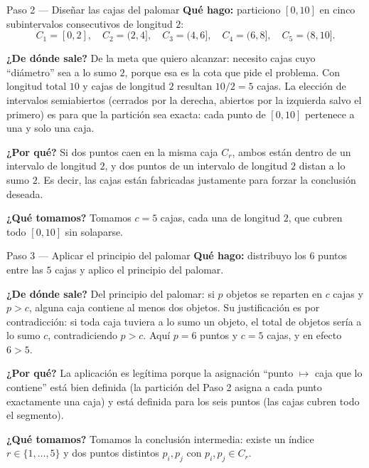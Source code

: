 \documentclass[11pt]{article}
\begin{document}
\begin{paso}{Paso 2 --- Diseñar las cajas del palomar}
\textbf{Qué hago:} particiono $[0,10]$ en cinco subintervalos consecutivos de longitud $2$:
\[
C_1=[0,2],\quad C_2=(2,4],\quad C_3=(4,6],\quad C_4=(6,8],\quad C_5=(8,10].
\]

\textbf{¿De dónde sale?} De la meta que quiero alcanzar: necesito cajas cuyo ``diámetro'' sea a lo
sumo $2$, porque esa es la cota que pide el problema. Con longitud total $10$ y cajas de longitud $2$
resultan $10/2=5$ cajas. La elección de intervalos semiabiertos (cerrados por la derecha, abiertos
por la izquierda salvo el primero) es para que la partición sea exacta: cada punto de $[0,10]$
pertenece a una y solo una caja.

\textbf{¿Por qué?} Si dos puntos caen en la misma caja $C_r$, ambos están dentro de un intervalo de
longitud $2$, y dos puntos de un intervalo de longitud $2$ distan a lo sumo $2$. Es decir, las cajas
están fabricadas justamente para forzar la conclusión deseada.

\textbf{¿Qué tomamos?} Tomamos $c=5$ cajas, cada una de longitud $2$, que cubren todo $[0,10]$ sin
solaparse.
\end{paso}

\begin{paso}{Paso 3 --- Aplicar el principio del palomar}
\textbf{Qué hago:} distribuyo los $6$ puntos entre las $5$ cajas y aplico el principio del palomar.

\textbf{¿De dónde sale?} Del principio del palomar: si $p$ objetos se reparten en $c$ cajas y $p>c$,
alguna caja contiene al menos dos objetos. Su justificación es por contradicción: si toda caja tuviera
a lo sumo un objeto, el total de objetos sería a lo sumo $c$, contradiciendo $p>c$. Aquí
$p=6$ puntos y $c=5$ cajas, y en efecto $6>5$.

\textbf{¿Por qué?} La aplicación es legítima porque la asignación ``punto $\mapsto$ caja que lo
contiene'' está bien definida (la partición del Paso 2 asigna a cada punto exactamente una caja) y
está definida para los seis puntos (las cajas cubren todo el segmento).

\textbf{¿Qué tomamos?} Tomamos la conclusión intermedia: existe un índice $r\in\{1,\dots ,5\}$ y dos
puntos distintos $p_i,p_j$ con $p_i,p_j\in C_r$.
\end{paso}
\end{document}
